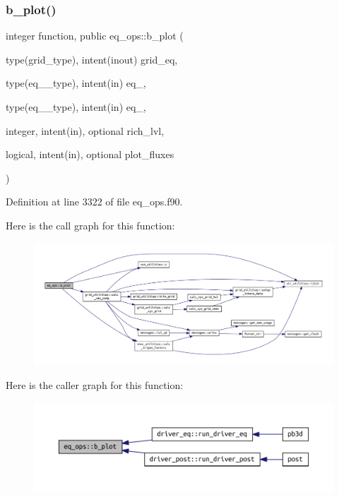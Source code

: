 \subsubsection{\texorpdfstring{b\+\_\+plot()}{b\_plot()}}
{\footnotesize\ttfamily integer function, public eq\+\_\+ops\+::b\+\_\+plot (\begin{DoxyParamCaption}\item[{type(grid\+\_\+type), intent(inout)}]{grid\+\_\+eq,  }\item[{type(eq\+\_\+1\+\_\+type), intent(in)}]{eq\+\_,  }\item[{type(eq\+\_\+2\+\_\+type), intent(in)}]{eq\+\_,  }\item[{integer, intent(in), optional}]{rich\+\_\+lvl,  }\item[{logical, intent(in), optional}]{plot\+\_\+fluxes }\end{DoxyParamCaption})}



Definition at line 3322 of file eq\+\_\+ops.\+f90.

Here is the call graph for this function\+:
\nopagebreak
\begin{figure}[H]
\begin{center}
\leavevmode
\includegraphics[width=350pt]{namespaceeq__ops_a9dab060a0bbbbaf6c8ccb66e1f5f160b_cgraph}
\end{center}
\end{figure}
Here is the caller graph for this function\+:
\nopagebreak
\begin{figure}[H]
\begin{center}
\leavevmode
\includegraphics[width=350pt]{namespaceeq__ops_a9dab060a0bbbbaf6c8ccb66e1f5f160b_icgraph}
\end{center}
\end{figure}
\mbox{\label{namespaceeq__ops_a8f774acd7a5af5e9ca315907e3d7a885}} 
